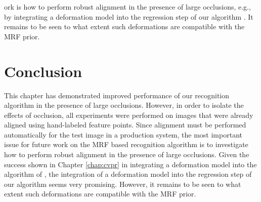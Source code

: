 ork is how to perform robust alignment in the presence of large occlusions, e.g., by integrating a deformation model into the regression step of our algorithm \cite{Wagner2009-CVPR}. It remains to be seen to what extent such deformations are compatible with the MRF prior. \vspace{0mm}

\section{Conclusion}
This chapter has demonstrated improved performance of our recognition algorithm in the presence of large occlusions.  However, in order to isolate the effects of occlusion, all experiments were performed on images that were already aligned using hand-labeled feature points.  Since alignment must be performed automatically for the test image in a production system, the most important issue for future work on the MRF based recognition algorithm is to investigate how to perform robust alignment in the presence of large occlusions.  Given the success shown in Chapter \ref{chap:cvpr} in integrating a deformation model into the algorithm of \cite{Wright2009-PAMI}, the integration of a deformation model into the regression step of our algorithm \cite{Wagner2009-CVPR} seems very promising. 
However, it remains to be seen to what extent such deformations are compatible with the MRF prior.  

%
%
%

%
